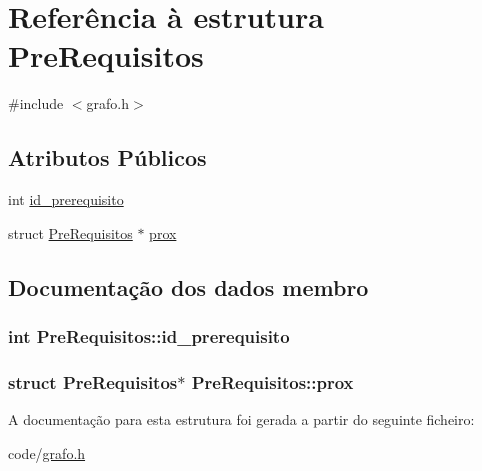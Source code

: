 \hypertarget{structPreRequisitos}{\section{Referência à estrutura Pre\-Requisitos}
\label{structPreRequisitos}
}


{\ttfamily \#include $<$grafo.\-h$>$}

\subsection*{Atributos Públicos}
\begin{DoxyCompactItemize}
\item 
int \hyperlink{structPreRequisitos_aac895640418edfa91ba7c8f01b91459e}{id\-\_\-prerequisito}
\item 
struct \hyperlink{structPreRequisitos}{Pre\-Requisitos} $\ast$ \hyperlink{structPreRequisitos_ad30378886dd7fba5247ad1c77fb395f1}{prox}
\end{DoxyCompactItemize}


\subsection{Documentação dos dados membro}
\hypertarget{structPreRequisitos_aac895640418edfa91ba7c8f01b91459e}{
\subsubsection[{id\-\_\-prerequisito}]{\setlength{\rightskip}{0pt plus 5cm}int Pre\-Requisitos\-::id\-\_\-prerequisito}}\label{structPreRequisitos_aac895640418edfa91ba7c8f01b91459e}
\hypertarget{structPreRequisitos_ad30378886dd7fba5247ad1c77fb395f1}{
\subsubsection[{prox}]{\setlength{\rightskip}{0pt plus 5cm}struct {\bf Pre\-Requisitos}$\ast$ Pre\-Requisitos\-::prox}}\label{structPreRequisitos_ad30378886dd7fba5247ad1c77fb395f1}


A documentação para esta estrutura foi gerada a partir do seguinte ficheiro\-:\begin{DoxyCompactItemize}
\item 
code/\hyperlink{grafo_8h}{grafo.\-h}\end{DoxyCompactItemize}
